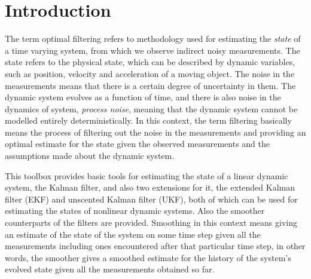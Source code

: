 %
\chapter{Introduction}
%

The term optimal filtering refers to methodology used for estimating
the {\it state} of a time varying system, from which we observe
indirect noisy measurements. The state refers to the physical state,
which can be described by dynamic variables, such as position,
velocity and acceleration of a moving object. The noise in the
measurements means that there is a certain degree of uncertainty in
them.  The dynamic system evolves as a function of time, and there is
also noise in the dynamics of system, {\it process noise}, meaning
that the dynamic system cannot be modelled entirely deterministically.
In this context, the term filtering basically means the process of
filtering out the noise in the measurements and providing an optimal
estimate for the state given the observed measurements and the
assumptions made about the dynamic system.

This toolbox provides basic tools for estimating the state of a linear
dynamic system, the Kalman filter, and also two extensions for it, the
extended Kalman filter (EKF) and unscented Kalman filter (UKF), both
of which can be used for estimating the states of nonlinear dynamic
systems. Also the smoother counterparts of the filters are provided.
Smoothing in this context means giving an estimate of the state of the
system on some time step given all the measurements including ones
encountered after that particular time step, in other words, the
smoother gives a smoothed estimate for the history of the system's
evolved state given all the measurements obtained so far.

